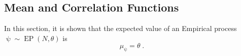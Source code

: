 \documentclass[12pt]{report}
\newcommand{\todolo}[1]{\todo[inline,color=green!50,linecolor=red]{#1}}
\DeclareMathOperator{\Drm}{\mathrm{D}}
\DeclareMathOperator{\Prm}{\mathrm{P}}
\DeclareMathOperator{\Erm}{\mathrm{E}}
\DeclareMathOperator{\drm}{\mathrm{d}}
\DeclareMathOperator{\Ycal}{\mathcal{Y}}
\DeclareMathOperator{\EP}{\mathrm{EP}}
\begin{document}
%
%
%


\subsection{Mean and Correlation Functions} \label{app:E_EP}

In this section, it is shown that the expected value of an Empirical process $\uppsi \sim \EP(N, \theta)$ is 
\begin{equation}
\mu_{\uppsi} = \theta \;.
\end{equation}
\end{document}
